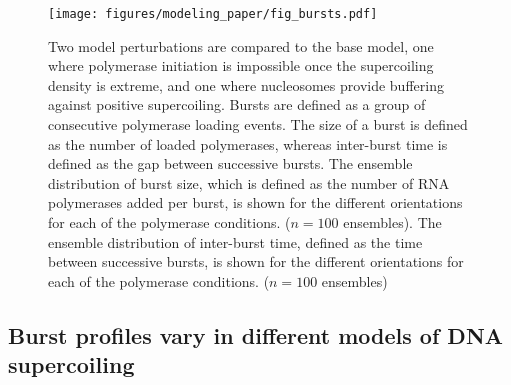 \documentclass[11pt]{article}
\begin{document}
\begin{figure}[htbp]
    \centering
    {\texttt{[image: figures/modeling\_paper/fig\_bursts.pdf]}
    \label{fig:perturbation_overview}
    \label{fig:burst_time_cartoon}
    \label{fig:burst_size_dynamics}
    \label{fig:interburst_time_dynamics}
    }
    \caption{
         Two model perturbations are compared to the base model, one where polymerase initiation is impossible once the supercoiling density is extreme, and one where nucleosomes provide buffering against positive supercoiling.
         Bursts are defined as a group of consecutive polymerase loading events. The size of a burst is defined as the number of loaded polymerases, whereas inter-burst time is defined as the gap between successive bursts.
         The ensemble distribution of burst size, which is defined as the number of RNA polymerases added per burst, is shown for the different orientations for each of the polymerase conditions. (\(n=100\) ensembles).
         The ensemble distribution of inter-burst time, defined as the time between successive bursts, is shown for the different orientations for each of the polymerase conditions. (\(n = 100\) ensembles)
    }
    \label{fig:top:bursts}
\end{figure}

\subsection{Burst profiles vary in different models of DNA supercoiling }
\end{document}
